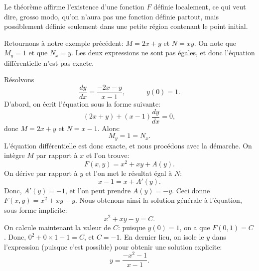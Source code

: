 Le théorème affirme l'existence d'une fonction $F$ \og{}définie localement\fg{}, ce qui veut dire, grosso modo,
qu'on n'aura pas une fonction définie partout, mais possiblement définie seulement dans une petite région contenant le point initial.

Retournons à notre exemple précédent: $M = 2x + y$ et $N = xy$.
On note que $M_y = 1$ et  que $N_x = y$.
Les deux expressions ne sont pas égales, et donc l'équation différentielle n'est pas exacte.

\begin{example}
	Résolvons
	\begin{equation*}
		\frac{dy}{dx} = \frac{-2x-y}{x-1} ,\quad  \qquad y(0) = 1.
	\end{equation*}
	D'abord, on écrit l'équation sous la forme suivante:
	\begin{equation*}
		(2x+y) + (x-1)\frac{dy}{dx} = 0,
	\end{equation*}
	donc $M = 2x+y$ et $N = x-1$.  Alors:
	\begin{equation*}
		M_y = 1 = N_x .
	\end{equation*}
	L'équation différentielle est donc exacte, et nous procédons avec la démarche.
	On intègre $M$ par rapport à $x$ et l'on trouve:
	\begin{equation*}
		F(x,y) = x^2+xy + A(y) .
	\end{equation*}
	On dérive par rapport à $y$ et l'on met le résultat égal à $N$:
	\begin{equation*}
		x-1 = x + A'(y) .
	\end{equation*}
	Donc, $A'(y) = -1$, et l'on peut prendre $A(y) = -y$.  Ceci donne $F(x, y) = x^2+xy-y$.
	Nous obtenons ainsi la solution générale à l'équation, sous forme implicite:
	\begin{equation*}
		x^2+xy-y = C.
	\end{equation*}
	On calcule maintenant la valeur de $C$: puisque $y(0)=1$, on a que
	$F(0,1) = C$.  Donc, $0^2+0\times 1 - 1 = C$, et $C=-1$.
	En dernier lieu, on isole le $y$ dans l'expression (puisque c'est possible) pour obtenir une solution explicite:
	\begin{equation*}
		y = \frac{-x^2-1}{x-1} .
	\end{equation*}
\end{example}

